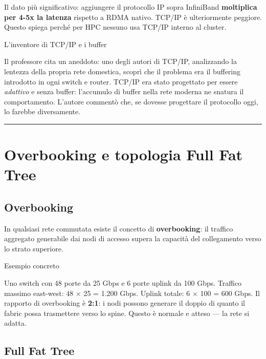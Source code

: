 \documentclass[
  italian,
  openany]{book}
\begin{document}
Il dato più significativo: aggiungere il protocollo IP sopra InfiniBand
\textbf{moltiplica per 4-5x la latenza} rispetto a RDMA nativo. TCP/IP è
ulteriormente peggiore. Questo spiega perché per HPC nessuno usa TCP/IP
interno al cluster.

\begin{calloutnote}{L’inventore di TCP/IP e i buffer}

Il professore cita un aneddoto: uno degli autori di TCP/IP, analizzando
la lentezza della propria rete domestica, scoprì che il problema era il
buffering introdotto in ogni switch e router. TCP/IP era stato
progettato per essere \emph{adattivo} e senza buffer: l'accumulo di
buffer nella rete moderna ne snatura il comportamento. L'autore commentò
che, se dovesse progettare il protocollo oggi, lo farebbe diversamente.

\end{calloutnote}

\begin{center}\rule{0.5\linewidth}{0.5pt}\end{center}

\section{Overbooking e topologia Full Fat
Tree}\label{overbooking-e-topologia-full-fat-tree}

\subsection{Overbooking}\label{overbooking}

In qualsiasi rete commutata esiste il concetto di \textbf{overbooking}:
il traffico aggregato generabile dai nodi di accesso supera la capacità
del collegamento verso lo strato superiore.

\begin{callouttip}{Esempio concreto}

Uno switch con 48 porte da 25 Gbps e 6 porte uplink da 100 Gbps.
Traffico massimo east-west: 48 × 25 = 1.200 Gbps. Uplink totale: 6 × 100
= 600 Gbps. Il rapporto di overbooking è \textbf{2:1}: i nodi possono
generare il doppio di quanto il fabric possa trasmettere verso lo spine.
Questo è normale e atteso --- la rete si adatta.

\end{callouttip}

\subsection{Full Fat Tree}\label{full-fat-tree}
\end{document}
